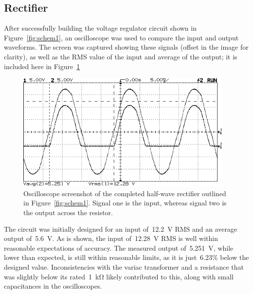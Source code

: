 \subsection{Rectifier}
After successfully building the voltage regulator circuit shown in
Figure~\ref{fig:schem1}, an oscilloscope was used to compare the input and
output waveforms.  The screen was captured showing these signals (offset in the
image for clarity), as well as the RMS value of the input and average of the
output; it is included here in Figure~\ref{fig:ckt1plot}
%
\begin{figure}[H]
	\centering
	\includegraphics[width=4.25in]{img/ss1.png}
	\parbox{4.25in}{\caption{Oscilloscope screenshot of the completed half-wave rectifier
		outlined in Figure~\ref{fig:schem1}.  Signal one is the input, whereas
		signal two is the output across the resistor.}
	\label{fig:ckt1plot}}
\end{figure}
%
The circuit was initially designed for an input of~\SI{12.2}{\volt} RMS and an
average output of~\SI{5.6}{\volt}.  As is shown, the input of~\SI{12.28}{\volt}
RMS is well within reasonable expectations of accuracy.  The measured output
of~\SI{5.251}{\volt}, while lower than expected, is still within reasonable
limits, as it is just~6.23\% below the designed value.  Inconsistencies with
the variac transformer and a resistance that was slightly below its
rated~\SI{1}{\kilo\ohm} likely contributed to this, along with small
capacitances in the oscilloscopes.

